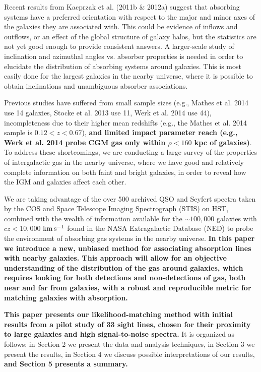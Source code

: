 \documentclass[twocolumn,tighten]{aastex6}
\begin{document}
Recent results from Kacprzak et al. (2011b $\&$ 2012a) suggest that absorbing systems have a preferred orientation with respect to the major and minor axes of the galaxies they are associated with. This could be evidence of inflows and outflows, or an effect of the global structure of galaxy halos, but the statistics are not yet good enough to provide consistent answers. A larger-scale study of inclination and azimuthal angles vs. absorber properties is needed in order to elucidate the distribution of absorbing systems around galaxies. This is most easily done for the largest galaxies in the nearby universe, where it is possible to obtain inclinations and unambiguous absorber associations. 

Previous studies have suffered from small sample sizes (e.g., Mathes et al. 2014 use 14 galaxies, Stocke et al. 2013 use 11, Werk et al. 2014 use 44), incompleteness due to their higher mean redshifts (e.g., the Mathes et al. 2014 sample is $0.12 <z<0.67$), \textbf{and limited impact parameter reach (e.g., Werk et al. 2014 probe CGM gas only within $\rho < 160$ kpc of galaxies)}. To address these shortcomings, we are conducting a large survey of the properties of intergalactic gas in the nearby universe, where we have good and relatively complete information on both faint and bright galaxies, in order to reveal how the IGM and galaxies affect each other. 

We are taking advantage of the over 500 archived QSO and Seyfert spectra taken by the COS and Space Telescope Imaging Spectrograph (STIS) on HST, combined with the wealth of information available for the $\sim100,000$ galaxies with $cz<10,000$ $\rm km\, s^{-1}$ found in the NASA Extragalactic Database (NED) to probe the environment of absorbing gas systems in the nearby universe. \textbf{In this paper we introduce a new, unbiased method for associating absorption lines with nearby galaxies. This approach will allow for an objective understanding of the distribution of the gas around galaxies, which requires looking for both detections and non-detections of gas, both near and far from galaxies, with a robust and reproducible metric for matching galaxies with absorption.} 

\textbf{This paper presents our likelihood-matching method with initial results from a pilot study of 33 sight lines, chosen for their proximity to large galaxies and high signal-to-noise spectra.} It is organized as follows: in Section 2 we present the data and analysis techniques, in Section 3 we present the results, in Section 4 we discuss possible interpretations of our results, \textbf{and Section 5 presents a summary.}
\end{document}
